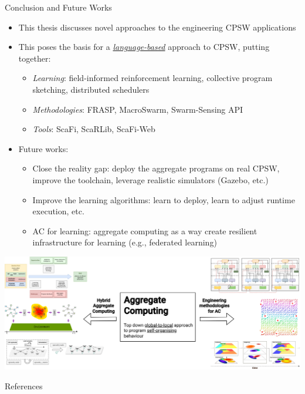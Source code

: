 \documentclass[presentation, 8pt,169]{beamer}\mode<presentation>{\usetheme{AMSBolognaFC}}
\begin{document}
\begin{frame}{Conclusion and Future Works}
\begin{itemize}
  \item This thesis discusses novel approaches to the engineering CPSW applications
  \item This poses the basis for a \emph{\underline{language-based}} approach to CPSW, putting together:
  \begin{itemize}
    \item \emph{{Learning}}: field-informed reinforcement learning, collective program sketching, distributed schedulers
    \item \emph{{Methodologies}}: FRASP, MacroSwarm, Swarm-Sensing API
    \item \emph{{Tools}}: ScaFi, ScaRLib, ScaFi-Web
  \end{itemize}
  \item Future works:
  \begin{itemize}
    \item Close the reality gap: deploy the aggregate programs on real CPSW, improve the toolchain, leverage realistic simulators (Gazebo, etc.)
    \item Improve the learning algorithms: learn to deploy, learn to adjust runtime execution, etc.
    \item AC for learning: aggregate computing as a way create resilient infrastructure for learning (e.g., federated learning)
  \end{itemize}
\end{itemize}
\end{frame}

\begin{frame}
\includegraphics[width=\textwidth]{img/contribution.drawio.png}
\end{frame}
\begin{frame}[allowframebreaks]{References}
  \def\bibfont{\footnotesize}
  \printbibliography
\end{frame}

\end{document}
